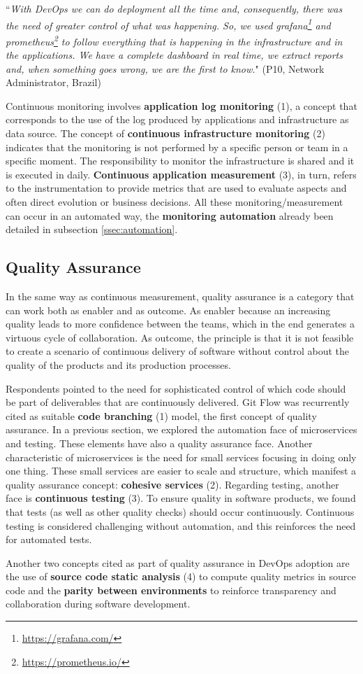 \begin{mq}
``\emph{With DevOps we can do deployment all the time and, consequently, there was
the need of greater control of what was happening. So, we used
grafana\footnote{\url{https://grafana.com/}} and
prometheus\footnote{\url{https://prometheus.io/}} to follow everything that is
happening in the infrastructure and in the applications. We have a complete
dashboard in real time, we extract reports and, when something goes wrong, we
are the first to know.}" (P10, Network Administrator, Brazil)
\end{mq}

Continuous monitoring involves \textbf{application log monitoring} (1), a
concept that corresponds to the use of the log produced by
applications and infrastructure as data source. The concept of
\textbf{continuous infrastructure monitoring} (2) indicates that the monitoring
is not performed by a specific person or team in a specific moment. The
responsibility to monitor the infrastructure is shared and it is executed in
daily. \textbf{Continuous application measurement} (3), in turn, refers to
the instrumentation to provide metrics that are used to evaluate aspects and
often direct evolution or business decisions. All these monitoring/measurement
can occur in an automated way, the \textbf{monitoring automation} already been
detailed in subsection \ref{ssec:automation}.

\subsection{Quality Assurance}

In the same way as continuous measurement, quality assurance is a category that
can work both as enabler and as outcome. As enabler because an increasing quality
leads to more confidence between the teams, which in the end generates a virtuous
cycle of collaboration. As outcome, the principle is that it is not
feasible to create a scenario of continuous delivery of software without control
about the quality of the products and its production processes.

Respondents pointed to the need for sophisticated control of which code should
be part of deliverables that are continuously delivered. Git Flow was
recurrently cited as suitable \textbf{code branching} (1) model, the first
concept of quality assurance.
In a previous section, we explored the automation face of
microservices and testing. These elements have also a quality assurance face.
Another characteristic of microservices is the need for small services focusing
in doing only one thing. These small services are easier to scale and
structure, which manifest a quality assurance concept: \textbf{cohesive
services} (2). Regarding testing, another face is \textbf{continuous
testing} (3). To ensure quality in software products, we found that
tests (as well as other quality checks) should occur continuously. Continuous testing
is considered challenging without automation, and this reinforces the need for automated
tests.

Another two concepts cited as part of quality assurance in DevOps adoption are
the use of \textbf{source code static analysis} (4) to compute quality metrics in
source code and the \textbf{parity between environments} to
reinforce transparency and collaboration during software development.
